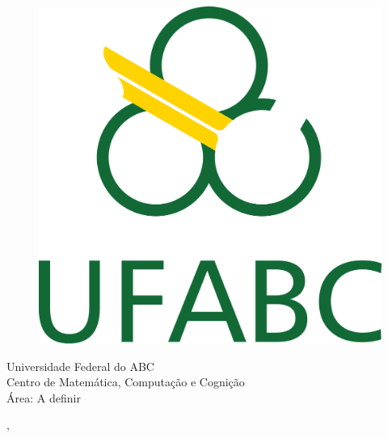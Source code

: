  \begin{capa}%
    \begin{figure}[h!]%
        \centering%
        \includegraphics[scale=1.2]{figs/logo.png}%
      \end{figure}%
    \center
	\ABNTEXchapterfont\large{Universidade Federal do ABC \\ Centro de Matemática, Computação e Cognição\\ Área: A definir}

    \vfill
    \ABNTEXchapterfont\bfseries\LARGE\imprimirtitulo
    \vfill

	\ABNTEXchapterfont\large\imprimirautor
	\vfill
%
	
    \large\imprimirlocal, \large\imprimirdata

    \vspace*{1cm}
  \end{capa}

